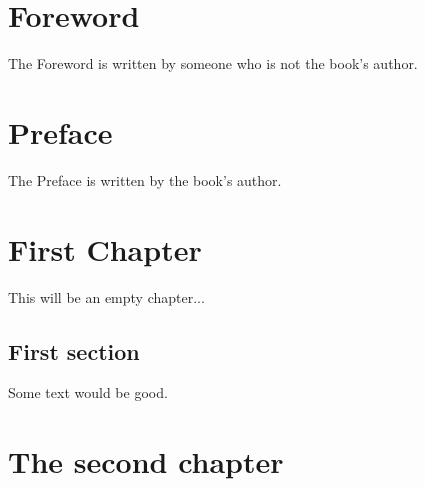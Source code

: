 \documentclass{book}
\begin{document}
	\frontmatter %
	\chapter*{Foreword}
	The Foreword is written by someone who is not the book's author.
	
	\chapter*{Preface}
	The Preface is written by the book's author.
	
	\tableofcontents
	
	\mainmatter %
	
	\chapter{First Chapter}
	This will be an empty chapter...
	\section{First section}
	Some text would be good.
	\chapter{The second chapter}
\end{document}
